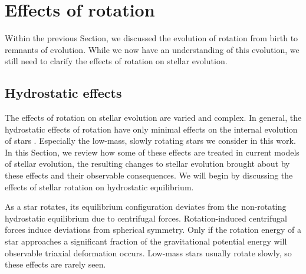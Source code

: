\section{Effects of rotation}
\label{sec:effects}

Within the previous Section, we discussed the evolution of rotation from birth to remnants of evolution.
While we now have an understanding of this evolution, we still need to clarify the effects of rotation on stellar evolution.

\subsection{Hydrostatic effects}

The effects of rotation on stellar evolution are varied and complex.
In general, the hydrostatic effects of rotation have only minimal effects on the internal evolution of stars \citep{kippenhahn_rotation_1970,maeder_evolution_2000}.
Especially the low-mass, slowly rotating stars we consider in this work.
In this Section, we review how some of these effects are treated in current models of stellar evolution, the resulting changes to stellar evolution brought about by these effects and their observable consequences.
We will begin by discussing the effects of stellar rotation on hydrostatic equilibrium.


As a star rotates, its equilibrium configuration deviates from the non-rotating hydrostatic equilibrium due to centrifugal forces. 
Rotation-induced centrifugal forces induce deviations from spherical symmetry.
Only if the rotation energy of a star approaches a significant fraction of the gravitational potential energy will observable triaxial deformation occurs.
Low-mass stars usually rotate slowly, so these effects are rarely seen.

